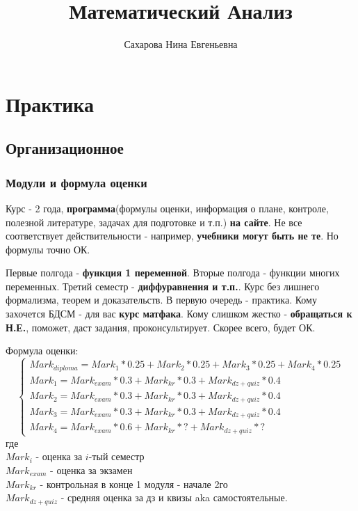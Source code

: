 \documentclass{article}
\title{Математический Анализ}
\author{Сахарова Нина Евгеньевна}
\begin{document}
\maketitle
 
\tableofcontents
 
 \section{Практика}
 \subsection{Организационное}
 \subsubsection{Модули и формула оценки}
 Курс - 2 года, \textbf{программа}(формулы оценки, информация о плане, контроле, полезной литературе, задачах для подготовке и т.п.) \textbf{на сайте}. Не все соответствует действительности - например, \textbf{учебники могут быть не те}. Но формулы точно ОК.
 
 Первые полгода  - \textbf{функция 1 переменной}. Вторые полгода - функции многих переменных. Третий семестр - \textbf{диффуравнения и т.п.}. Курс без лишнего формализма, теорем и доказательств. В первую очередь - практика. Кому захочется БДСМ - для вас \textbf{курс матфака}. Кому слишком жестко - \textbf{обращаться к Н.Е.}, поможет, даст задания, проконсультирует. Скорее всего, будет ОК.
 
 Формула оценки:
 $$
\begin{cases}
	Mark_{diploma} = Mark_1*0.25 + Mark_2*0.25 + Mark_3*0.25 + Mark_4*0.25
	\\
	Mark_1 = Mark_{exam}*0.3 + Mark_{kr}*0.3 + Mark_{dz+quiz}*0.4
	\\
	Mark_2 = Mark_{exam}*0.3 + Mark_{kr}*0.3 + Mark_{dz+quiz}*0.4
	\\
	Mark_3 = Mark_{exam}*0.3 + Mark_{kr}*0.3 + Mark_{dz+quiz}*0.4
	\\
	Mark_4 = Mark_{exam}*0.6 + Mark_{kr}*? + Mark_{dz+quiz}*?
\end{cases}
$$
 где \\
 $Mark_i$ - оценка за $i$-тый семестр \\
 $Mark_{exam}$ - оценка за экзамен \\
 $Mark_{kr}$ - контрольная в конце 1 модуля - начале 2го \\
 $Mark_{dz + quiz}$ - средняя оценка за дз и квизы aka самостоятельные.\\
\end{document}
